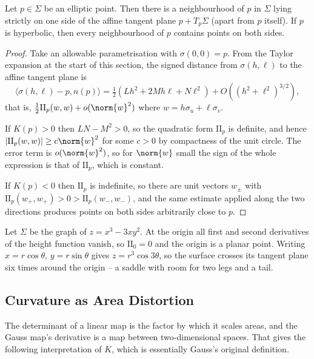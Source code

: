 \documentclass[a4paper]{scrartcl}
\begin{document}
\begin{proposition}
    Let $p \in \Sigma$ be an elliptic point. Then there is a neighbourhood of $p$ in $\Sigma$ lying strictly on one side of the affine tangent plane $p + T_p\Sigma$ (apart from $p$ itself). If $p$ is hyperbolic, then every neighbourhood of $p$ contains points on both sides.
\end{proposition}
\begin{proof}
    Take an allowable parametrisation with $\sigma(0,0) = p$. From the Taylor expansion at the start of this section, the signed distance from $\sigma(h, \ell)$ to the affine tangent plane is
    $$
    \langle \sigma(h,\ell) - p, n(p)\rangle = \tfrac{1}{2}\left(Lh^2 + 2Mh\ell + N\ell^2\right) + O\left((h^2+\ell^2)^{3/2}\right),
    $$
    that is, $\tfrac12 \mathrm{II}_p(w,w) + o(\norm{w}^2)$ where $w = h\sigma_u + \ell\sigma_v$.

    If $K(p) > 0$ then $LN - M^2 > 0$, so the quadratic form $\mathrm{II}_p$ is definite, and hence $|\mathrm{II}_p(w,w)| \geq c\norm{w}^2$ for some $c > 0$ by compactness of the unit circle. The error term is $o(\norm{w}^2)$, so for $\norm{w}$ small the sign of the whole expression is that of $\mathrm{II}_p$, which is constant.

    If $K(p) < 0$ then $\mathrm{II}_p$ is indefinite, so there are unit vectors $w_\pm$ with $\mathrm{II}_p(w_+, w_+) > 0 > \mathrm{II}_p(w_-,w_-)$, and the same estimate applied along the two directions produces points on both sides arbitrarily close to $p$.
\end{proof}

\begin{example}
    Let $\Sigma$ be the graph of $z = x^3 - 3xy^2$. At the origin all first and second derivatives of the height function vanish, so $\mathrm{II}_0 = 0$ and the origin is a planar point. Writing $x = r\cos\theta$, $y = r\sin\theta$ gives $z = r^3\cos 3\theta$, so the surface crosses its tangent plane six times around the origin -- a saddle with room for two legs and a tail.
\end{example}

\subsection{Curvature as Area Distortion}

The determinant of a linear map is the factor by which it scales areas, and the Gauss map's derivative is a map between two-dimensional spaces. That gives the following interpretation of $K$, which is essentially Gauss's original definition.
\end{document}
